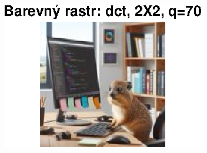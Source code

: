 \begin{figure}[H]
\begin{minipage}[b]{0.3\textwidth}
    \end{minipage}
    \hfill
    \begin{minipage}[b]{0.3\textwidth}
        \centering
        \includegraphics[width=\textwidth]{images/barevny_dct_2X2_q70.eps}
    \end{minipage}
\end{figure}

